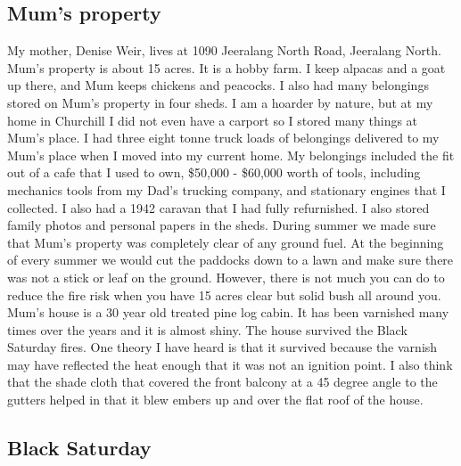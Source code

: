 \documentclass[a4paper]{article}
\begin{document}
    \subsection{Mum's property}

        My mother, Denise Weir, lives at 1090 Jeeralang North Road, Jeeralang North. Mum's property is about 15 acres. It is a hobby farm. I keep alpacas and a goat up there, and Mum keeps chickens and peacocks.
        I also had many belongings stored on Mum's property in four sheds. I am a hoarder by nature, but at my home in Churchill I did not even have a carport so I stored many things at Mum's place. I had three eight tonne truck loads of belongings delivered to my Mum's place when I moved into my current home. My belongings included the fit out of a cafe that I used to own, \$50,000 - \$60,000 worth of tools, including mechanics tools from my Dad's trucking company, and stationary engines that I collected. I also had a 1942 caravan that I had fully refurnished. I also stored family photos and personal papers in the sheds.
        During summer we made sure that Mum's property was completely clear of any ground fuel. At the beginning of every summer we would cut the paddocks down to a lawn and make sure there was not a stick or leaf on the ground. However, there is not much you can do to reduce the fire risk when you have 15 acres clear but solid bush all around you.
        Mum's house is a 30 year old treated pine log cabin. It has been varnished many times over the years and it is almost shiny. The house survived the Black Saturday fires. One theory I have heard is that it survived because the varnish may have reflected the heat enough that it was not an ignition point. I also think that the shade cloth that covered the front balcony at a 45 degree angle to the gutters helped in that it blew embers up and over the flat roof of the house.

    \subsection{Black Saturday}
\end{document}
